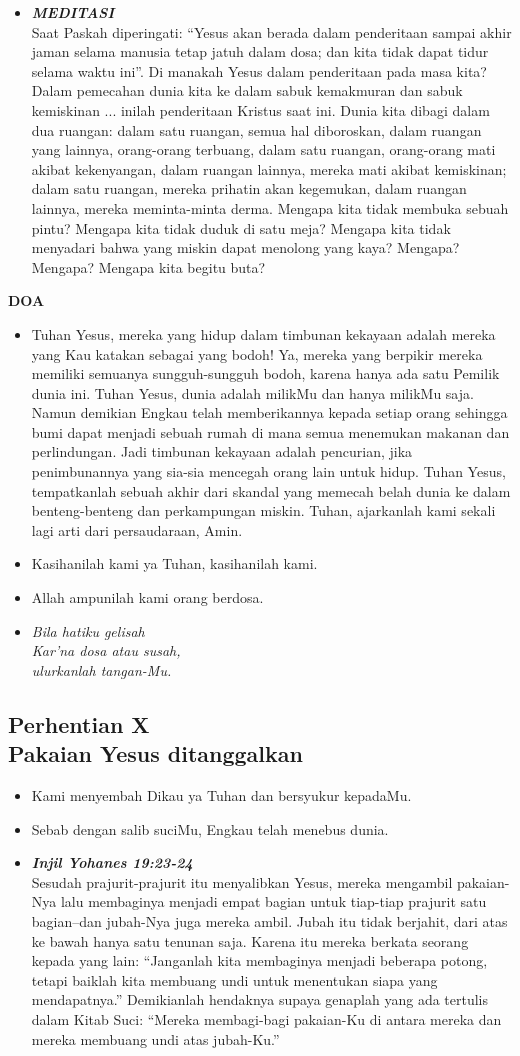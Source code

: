 \documentclass[a5paper,titlepage,11pt,openany]{scrbook}
\newcommand{\BU}[1]{\begin{itemize} \item[U:] #1 \end{itemize}}
\newcommand{\BP}[1]{\begin{itemize} \item[P:] #1 \end{itemize}}
\newcommand{\kamiMenyembah}{\BP{ Kami menyembah Dikau ya Tuhan dan bersyukur kepadaMu.}
\BU{Sebab dengan salib suciMu, Engkau telah menebus dunia.}
}
\newcommand{\kasihanilahKami}{\BP{Kasihanilah kami ya Tuhan, kasihanilah kami.}
\BU{Allah ampunilah kami orang berdosa.}}
\newcommand{\BPi}[2]
{\begin{itemize} \item[P1:] \textbf{\emph{#1}}\\#2 \end{itemize}}
\newcommand{\BPii}[1]
{\begin{itemize} \item[P2:] \textbf{\emph{MEDITASI}}\\#1 \end{itemize}}
\newcommand{\lagu}[2]{%
\begin{itemize}
\item[#1.] \it{#2}
\end{itemize}}
\newcommand{\henti}[2]{%
\subsection*{Perhentian #1\\#2 } 
\kamiMenyembah
}
\begin{document}
\BPii{
	Saat Paskah diperingati: ``Yesus akan berada dalam penderitaan sampai akhir jaman selama manusia tetap jatuh dalam dosa; dan kita tidak dapat tidur selama waktu ini''.
	Di manakah Yesus dalam penderitaan pada masa kita? Dalam pemecahan dunia kita ke dalam sabuk kemakmuran dan sabuk kemiskinan ... inilah penderitaan Kristus saat ini. Dunia kita dibagi dalam dua ruangan: dalam satu ruangan, semua hal diboroskan, dalam ruangan yang lainnya, orang-orang terbuang, dalam satu ruangan, orang-orang mati akibat kekenyangan, dalam ruangan lainnya, mereka mati akibat kemiskinan; dalam satu ruangan, mereka prihatin akan kegemukan, dalam ruangan lainnya, mereka meminta-minta derma. Mengapa kita tidak membuka sebuah pintu? Mengapa kita tidak duduk di satu meja? Mengapa kita tidak menyadari bahwa yang miskin dapat menolong yang kaya? Mengapa? Mengapa? Mengapa kita begitu buta? }

\textbf{DOA}

\BU{Tuhan Yesus, mereka yang hidup dalam timbunan kekayaan adalah mereka yang Kau katakan sebagai yang bodoh!  Ya, mereka yang berpikir mereka memiliki semuanya sungguh-sungguh bodoh, karena hanya ada satu Pemilik dunia ini. Tuhan Yesus, dunia adalah milikMu dan hanya milikMu saja. Namun demikian Engkau telah memberikannya kepada setiap orang sehingga bumi dapat menjadi sebuah rumah di mana semua menemukan makanan dan perlindungan. Jadi timbunan kekayaan adalah pencurian, jika penimbunannya yang sia-sia mencegah orang lain untuk hidup. Tuhan Yesus, tempatkanlah sebuah akhir dari skandal yang memecah belah dunia ke dalam benteng-benteng dan perkampungan miskin. Tuhan, ajarkanlah kami sekali lagi arti dari persaudaraan, Amin. }

\kasihanilahKami

\lagu{10}{Bila hatiku gelisah\\
Kar'na dosa atau susah,\\
ulurkanlah tangan-Mu.}

\henti{X}{	Pakaian Yesus ditanggalkan}

\BPi{	Injil Yohanes 19:23-24 }{
	Sesudah prajurit-prajurit itu menyalibkan Yesus, mereka mengambil pakaian-Nya lalu membaginya menjadi empat bagian untuk tiap-tiap prajurit satu bagian--dan jubah-Nya juga mereka ambil. Jubah itu tidak berjahit, dari atas ke bawah hanya satu tenunan saja. Karena itu mereka berkata seorang kepada yang lain: ``Janganlah kita membaginya menjadi beberapa potong, tetapi baiklah kita membuang undi untuk menentukan siapa yang mendapatnya.'' Demikianlah hendaknya supaya genaplah yang ada tertulis dalam Kitab Suci: ``Mereka membagi-bagi pakaian-Ku di antara mereka dan mereka membuang undi atas jubah-Ku.'' }
\end{document}
